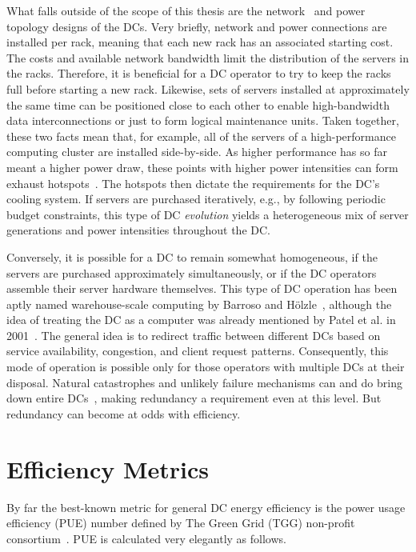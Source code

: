 \documentclass[officiallayout]{tktla}
\begin{document}
What falls outside of the scope of this thesis are the
network~\cite{Kant2009,Abts2012} and power topology designs of the DCs. Very
briefly, network and power connections are installed per rack, meaning that
each new rack has an associated starting cost. The costs and available network
bandwidth limit the distribution of the servers in the racks. Therefore, it is
beneficial for a DC operator to try to keep the racks full before starting a
new rack. Likewise, sets of servers installed at approximately the same time
can be positioned close to each other to enable high-bandwidth data
interconnections or just to form logical maintenance units. Taken together,
these two facts mean that, for example, all of the servers of a
high-performance computing cluster are installed side-by-side. As higher
performance has so far meant a higher power draw, these points with higher
power intensities can form exhaust
hotspots~\cite{Bailey2006,Woods2010,Google2011,Seymour2011}. The hotspots then
dictate the requirements for the DC's cooling system. If servers are purchased
iteratively, e.g., by following periodic budget constraints, this type of DC
\emph{evolution} yields a heterogeneous mix of server generations and power
intensities throughout the DC.  

Conversely, it is possible for a DC to remain somewhat homogeneous, if the
servers are purchased approximately simultaneously, or if the DC operators
assemble their server hardware themselves. This type of DC operation has been
aptly named warehouse-scale computing by Barroso and
Hölzle~\cite{Barroso2009}, although the idea of treating the DC as a computer
was already mentioned by Patel et al. in 2001~\cite{Patel2001}. The general
idea is to redirect traffic between different DCs based on service
availability, congestion, and client request patterns. Consequently, this mode
of operation is possible only for those operators with multiple DCs at their
disposal. Natural catastrophes and unlikely failure mechanisms can and do
bring down entire DCs~\cite{Christian2012}, making redundancy a requirement
even at this level. But redundancy can become at odds with efficiency.


\section{Efficiency Metrics}
\label{sec:metrics}

By far the best-known metric for general DC energy efficiency is the power
usage efficiency (PUE) number defined by The Green Grid (TGG) non-profit
consortium~\cite{Azevedo2011,Belady2008a}. PUE is calculated very elegantly as
follows.
\end{document}
